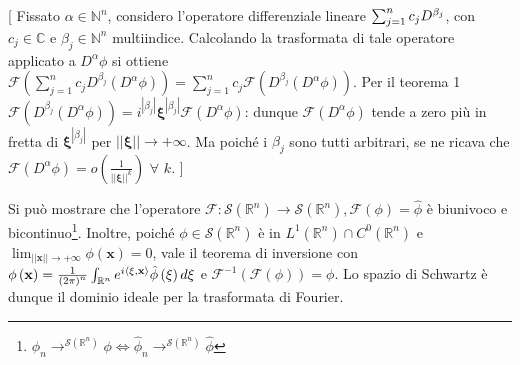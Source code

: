 \documentclass{article}
\begin{document}
[ Fissato $\alpha \in 
\mathbb{N}
^{n}$, considero l'operatore differenziale lineare $\sum_{j=1}^{n}c_{j}D^{%
\beta _{j}}$, con $c_{j}\in 
\mathbb{C}
$ e $\beta _{j}\in 
\mathbb{N}
^{n}$ multiindice. Calcolando la trasformata di tale operatore applicato a $%
D^{\alpha }\phi $ si ottiene $\mathcal{F}\left( \sum_{j=1}^{n}c_{j}D^{\beta
_{j}}\left( D^{\alpha }\phi \right) \right) =\sum_{j=1}^{n}c_{j}\mathcal{F}%
\left( D^{\beta _{j}}\left( D^{\alpha }\phi \right) \right) $. Per il
teorema 1 $\mathcal{F}\left( D^{\beta _{j}}\left( D^{\alpha }\phi \right)
\right) =i^{\left\vert \beta _{j}\right\vert }\mathbf{\xi }^{\left\vert
\beta _{j}\right\vert }\mathcal{F}\left( D^{\alpha }\phi \right) $: dunque $%
\mathcal{F}\left( D^{\alpha }\phi \right) $ tende a zero pi\`{u} in fretta
di $\mathbf{\xi }^{\left\vert \beta _{j}\right\vert }$ per $\left\vert
\left\vert \mathbf{\xi }\right\vert \right\vert \rightarrow +\infty $. Ma
poich\'{e} i $\beta _{j}$ sono tutti arbitrari, se ne ricava che $\mathcal{F}%
\left( D^{\alpha }\phi \right) =o\left( \frac{1}{\left\vert \left\vert 
\mathbf{\xi }\right\vert \right\vert ^{k}}\right) $ $\forall $ $k$. ]

Si pu\`{o} mostrare che l'operatore $\mathcal{F}:\mathcal{S}\left( 
\mathbb{R}
^{n}\right) \rightarrow \mathcal{S}\left( 
\mathbb{R}
^{n}\right) ,\mathcal{F}\left( \phi \right) =\hat{\phi}$ \`{e} biunivoco e
bicontinuo\footnote{$\phi _{n}\rightarrow ^{\mathcal{S}\left( 
\mathbb{R}
^{n}\right) }\phi \Longleftrightarrow \hat{\phi}_{n}\rightarrow ^{\mathcal{S}%
\left( 
\mathbb{R}
^{n}\right) }\hat{\phi}$}. Inoltre, poich\'{e} $\phi \in \mathcal{S}\left( 
\mathbb{R}
^{n}\right) $ \`{e} in $L^{1}\left( 
\mathbb{R}
^{n}\right) \cap C^{0}\left( 
\mathbb{R}
^{n}\right) $ e $\lim_{\left\vert \left\vert \mathbf{x}\right\vert
\right\vert \rightarrow +\infty }\phi \left( \mathbf{x}\right) =0$, vale il
teorema di inversione con $\phi \left( \mathbf{x}\right) =\frac{1}{\left(
2\pi \right) ^{n}}\int_{%
\mathbb{R}
^{n}}e^{i\left\langle \mathbf{\xi ,x}\right\rangle }\hat{\phi}\left( \mathbf{%
\xi }\right) d\mathbf{\xi }$ e $\mathcal{F}^{-1}\left( \mathcal{F}\left(
\phi \right) \right) =\phi $. Lo spazio di Schwartz \`{e} dunque il dominio
ideale per la trasformata di Fourier.
\end{document}
